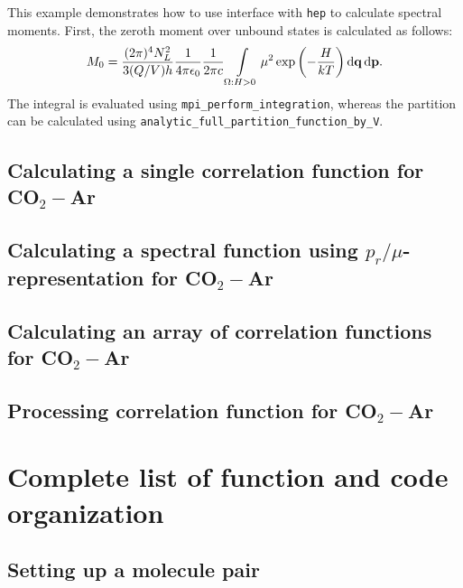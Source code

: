 \documentclass[color]{article}
\newcommand{\lb}{\left(}
\newcommand{\rb}{\right)}
\newcommand{\mf}{\mathbf}
\newcommand*\diff{\mathop{}\!\mathrm{d}}
\begin{document}
This example demonstrates how to use interface with \texttt{hep} to calculate spectral moments. 
First, the zeroth moment over unbound states is calculated as follows:
\begin{gather}
    M_0 = \frac{(2 \pi)^4 N_L^2}{3 (Q/V) h} \frac{1}{4 \pi \epsilon_0} \frac{1}{2 \pi c} \int\limits_{\Omega: H > 0} \mu^2 \exp \lb -\frac{H}{kT} \rb \diff{\mf{q}} \diff{\mf{p}}. \notag
\end{gather}
%
The integral is evaluated using \texttt{mpi\_perform\_integration}, whereas the partition can be calculated using \texttt{analytic\_full\_partition\_function\_by\_V}.    


\subsection{Calculating a single correlation function for CO$_2-$Ar}
\label{subsec:example-correlation-co2-ar}

\subsection{Calculating a spectral function using $p_r/\mu$-representation for CO$_2-$Ar}
\label{subsec:example-prmu-co2-ar}

\subsection{Calculating an array of correlation functions for CO$_2-$Ar}
\label{subsec:example-correlation-array-co2-ar}

\subsection{Processing correlation function for CO$_2-$Ar}
\label{subsec:example-processing}


\section{Complete list of function and code organization}
\label{sec:code-organization}


\subsection{Setting up a molecule pair}
\label{subsec:module-hawaii}
\end{document}
